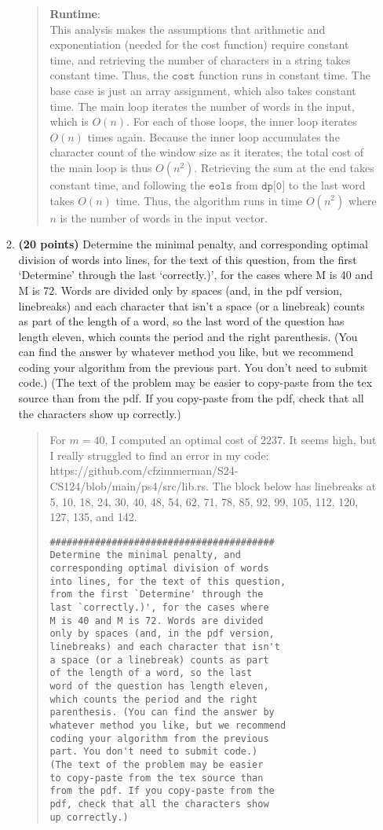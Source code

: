 \documentclass[11pt]{article}
\newcommand{\code}[1]{$\texttt{#1}$}
\begin{document}
\begin{enumerate}
\begin{enumerate}
\begin{quote}
\medskip
\textbf{Runtime}: \\
This analysis makes the assumptions that arithmetic and exponentiation (needed for the cost function) require constant time, and retrieving the number of characters in a string takes constant time. Thus, the \code{cost} function runs in constant time. The base case is just an array assignment, which also takes constant time. The main loop iterates the number of words in the input, which is $O(n)$. For each of those loops, the inner loop iterates $O(n)$ times again. Because the inner loop accumulates the character count of the window size as it iterates, the total cost of the main loop is thus $O(n^2)$. Retrieving the sum at the end takes constant time, and following the \code{eols} from \code{dp[0]} to the last word takes $O(n)$ time. Thus, the algorithm runs in time $O(n^2)$ where $n$ is the number of words in the input vector.
\end{quote}

\item
{\bf (20 points)}
Determine the minimal penalty, and corresponding optimal division of words into lines, for the text of this question, from the first `Determine' through the last `correctly.)', for the cases where M is 40 and M is 72. Words are divided only by spaces (and, in the pdf version, linebreaks) and each character that isn't a space (or a linebreak) counts as part of the length of a word, so the last word of the question has length eleven, which counts the period and the right parenthesis. (You can find the answer by whatever method you like, but we recommend coding your algorithm from the previous part. You don't need to submit code.) (The text of the problem may be easier to copy-paste from the tex source than from the pdf. If you copy-paste from the pdf, check that all the characters show up correctly.)
\begin{quote}
  \color{purple}
  For $m = 40$, I computed an optimal cost of $2237$. It seems high, but I really struggled to find an error in my code: https://github.com/cfzimmerman/S24-CS124/blob/main/ps4/src/lib.rs. The block below has linebreaks at 5, 10, 18, 24, 30, 40, 48, 54, 62, 71, 78, 85, 92, 99, 105, 112, 120, 127, 135, and 142.
  \begin{verbatim}
########################################
Determine the minimal penalty, and
corresponding optimal division of words
into lines, for the text of this question,
from the first `Determine' through the
last `correctly.)', for the cases where
M is 40 and M is 72. Words are divided
only by spaces (and, in the pdf version,
linebreaks) and each character that isn't
a space (or a linebreak) counts as part
of the length of a word, so the last
word of the question has length eleven,
which counts the period and the right
parenthesis. (You can find the answer by
whatever method you like, but we recommend
coding your algorithm from the previous
part. You don't need to submit code.)
(The text of the problem may be easier
to copy-paste from the tex source than
from the pdf. If you copy-paste from the
pdf, check that all the characters show
up correctly.)
  \end{verbatim}


\end{quote}
\end{enumerate}
\end{enumerate}
\end{document}

